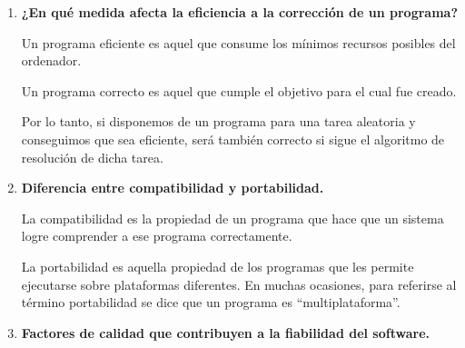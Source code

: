 \documentclass[12pt,letterpaper]{article}
\begin{document}
\begin{enumerate}
		\item \textbf{¿En qué medida afecta la eficiencia a la corrección de un programa?}
		
		Un programa eficiente es aquel que consume los mínimos recursos posibles del ordenador.
		
		Un programa correcto es aquel que cumple el objetivo para el cual fue creado.
		
		Por lo tanto, si disponemos de un programa para una tarea aleatoria y conseguimos que sea eficiente, será también correcto si sigue el algoritmo de resolución de dicha tarea.
		
		\item \textbf{Diferencia entre compatibilidad y portabilidad.}
		
		La compatibilidad es la propiedad de un programa que hace que un sistema logre comprender a ese programa correctamente.
		
		La portabilidad es aquella propiedad de los programas que les permite ejecutarse sobre plataformas diferentes. En muchas ocasiones, para referirse al término portabilidad se
		dice que un programa es ``multiplataforma''.
		
		\item \textbf{Factores de calidad que contribuyen a la fiabilidad del software.}
		

\end{enumerate}
\end{document}
